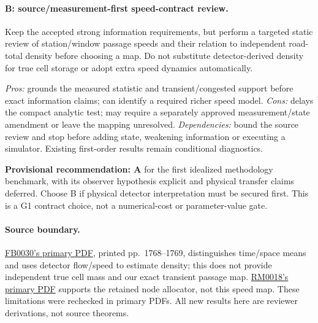 \documentclass[10pt,a4paper]{article}
\begin{document}
\paragraph{B: source/measurement-first speed-contract review.}
Keep the accepted strong information requirements, but perform a targeted
static review of station/window passage speeds and their relation to independent
road-total density before choosing a map. Do not substitute detector-derived
density for true cell storage or adopt extra speed dynamics automatically.

\emph{Pros:} grounds the measured statistic and transient/congested support
before exact information claims; can identify a required richer speed model.
\emph{Cons:} delays the compact analytic test; may require a separately approved
measurement/state amendment or leave the mapping unresolved.
\emph{Dependencies:} bound the source review and stop before adding state,
weakening information or executing a simulator. Existing first-order results
remain conditional diagnostics.

\textbf{Provisional recommendation: A} for the first idealized methodology
benchmark, with its observer hypothesis explicit and physical transfer claims
deferred. Choose B if physical detector interpretation must be secured first.
This is a G1 contract choice, not a numerical-cost or parameter-value gate.

\paragraph{Source boundary.}
\href{https://repository.tudelft.nl/file/File_2c4359e7-5e5a-4651-964f-6f3610ab89ae}{FB0030's primary PDF},
printed pp.\ 1768--1769, distinguishes time/space means and uses
detector flow/speed to estimate density; this does not provide independent true
cell mass and our exact transient passage map.
\href{https://horowitz.me.berkeley.edu/Publications_files/All_papers_numbered/Wright_node_models_transportation_networks_Transportation_research_B_2017.pdf}{RM0018's primary PDF}
supports the retained
node allocator, not this speed map. These limitations were rechecked in primary
PDFs. All new results here are reviewer derivations, not source theorems.
\end{document}
